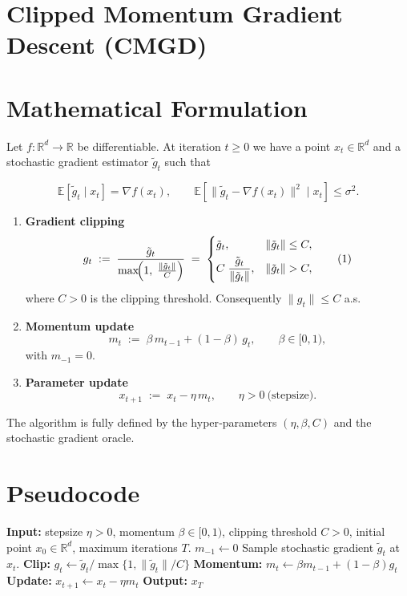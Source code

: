 \documentclass{article}
\newcommand{\EE}{\mathbb{E}}
\newcommand{\R}{\mathbb{R}}
\begin{document}
\section*{Clipped Momentum Gradient Descent (CMGD)}

\section*{Mathematical Formulation}
Let $f:\R^{d}\rightarrow\R$ be differentiable.  
At iteration $t\ge 0$ we have a point $x_t\in\R^{d}$ and a stochastic
gradient estimator $\tilde g_t$ such that  

\[
\EE\!\left[\tilde g_t\mid x_t\right]=\nabla f(x_t),\qquad
\EE\!\left[\|\tilde g_t-\nabla f(x_t)\|^{2}\mid x_t\right]\le\sigma^{2}.
\]

\begin{enumerate}
\item \textbf{Gradient clipping}
\[
g_t\;:=\;\frac{\tilde g_t}{\max\!\Bigl(1,\;\frac{\|\tilde g_t\|}{C}\Bigr)}
      \;=\;
      \begin{cases}
      \tilde g_t, & \|\tilde g_t\|\le C,\\[4pt]
      \displaystyle C\;\frac{\tilde g_t}{\|\tilde g_t\|}, & \|\tilde g_t\|>C,
      \end{cases}
\tag{1}
\]
where $C>0$ is the clipping threshold. Consequently $\|g_t\|\le C$ a.s.

\item \textbf{Momentum update}
\[
m_t \;:=\;\beta\,m_{t-1}+(1-\beta)\,g_t,\qquad\beta\in[0,1),
\tag{2}
\]
with $m_{-1}=0$.

\item \textbf{Parameter update}
\[
x_{t+1}\;:=\;x_t-\eta\,m_t,\qquad\eta>0\ \text{(stepsize)}.
\tag{3}
\]
\end{enumerate}

The algorithm is fully defined by the hyper‑parameters
$(\eta,\beta,C)$ and the stochastic gradient oracle.

\section*{Pseudocode}
\begin{algorithm}[H]
\caption{Clipped Momentum Gradient Descent (CMGD)}
\begin{algorithmic}[1]
\STATE \textbf{Input:} stepsize $\eta>0$, momentum $\beta\in[0,1)$, clipping threshold $C>0$, 
initial point $x_{0}\in\R^{d}$, maximum iterations $T$.
\STATE $m_{-1}\gets 0$
    \STATE Sample stochastic gradient $\tilde g_t$ at $x_t$.
    \STATE \textbf{Clip:} $g_t\gets\tilde g_t/\max\{1,\|\tilde g_t\|/C\}$ \hfill{}
    \STATE \textbf{Momentum:} $m_t\gets\beta m_{t-1}+(1-\beta)g_t$ \hfill{}
    \STATE \textbf{Update:} $x_{t+1}\gets x_t-\eta m_t$ \hfill{}
\ENDFOR
\STATE \textbf{Output:} $x_T$
\end{algorithmic}
\end{algorithm}
\end{document}
